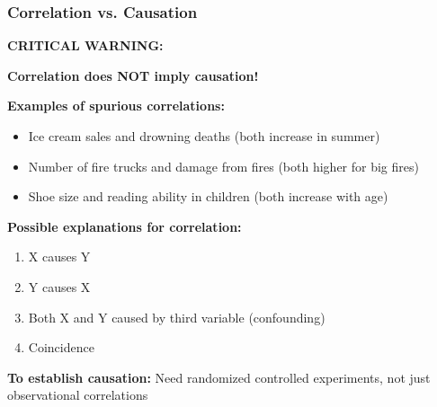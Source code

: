 \documentclass{beamer}
\begin{document}
\begin{frame}
\frametitle{Correlation vs. Causation}
\textbf{CRITICAL WARNING:}

\vspace{0.3cm}
\begin{center}
\Large{\textbf{Correlation does NOT imply causation!}}
\end{center}

\vspace{0.5cm}
\textbf{Examples of spurious correlations:}
\begin{itemize}
\item Ice cream sales and drowning deaths (both increase in summer)
\item Number of fire trucks and damage from fires (both higher for big fires)
\item Shoe size and reading ability in children (both increase with age)
\end{itemize}

\vspace{0.5cm}
\textbf{Possible explanations for correlation:}
\begin{enumerate}
\item X causes Y
\item Y causes X
\item Both X and Y caused by third variable (confounding)
\item Coincidence
\end{enumerate}

\vspace{0.3cm}
\textbf{To establish causation:} Need randomized controlled experiments, not just observational correlations
\end{frame}
\end{document}
